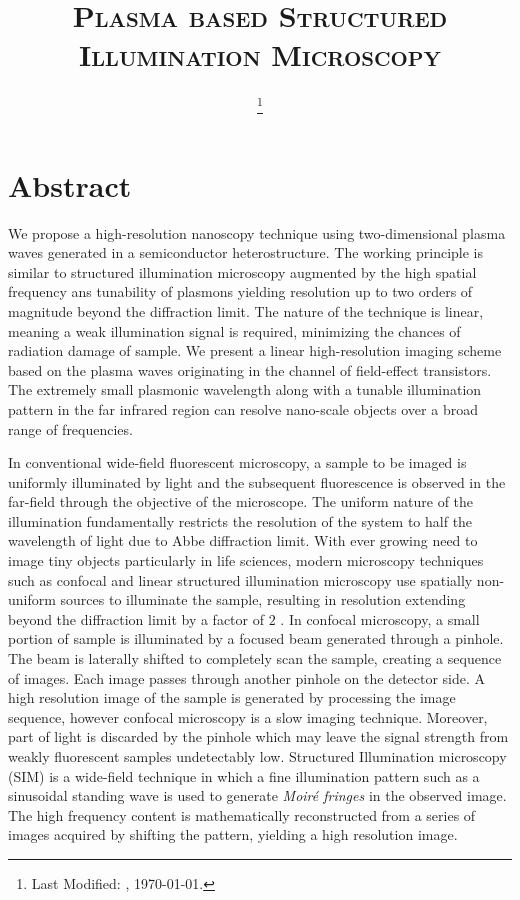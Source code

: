 \documentclass[11pt]{article}
\begin{document}
\title{\textsc{Plasma based Structured Illumination Microscopy}}
\date{\footnote{Last Modified: \currenttime, \today.}}
\maketitle


\section{Abstract}
%
We propose a high-resolution nanoscopy technique using two-dimensional plasma waves generated in a semiconductor heterostructure. The working principle is similar to structured illumination microscopy augmented by the high spatial frequency ans tunability of plasmons yielding resolution up to two orders of magnitude beyond the diffraction limit. The nature of the technique is linear, meaning a weak illumination signal is required, minimizing the chances of radiation damage of sample.
We present a linear high-resolution imaging scheme based on the plasma waves originating in the channel of field-effect transistors. The extremely small plasmonic wavelength along with a tunable illumination pattern in the far infrared region can resolve nano-scale objects over a broad range of frequencies.

In conventional wide-field fluorescent microscopy, a sample to be imaged is uniformly illuminated by light and the subsequent fluorescence is observed in the far-field through the objective of the microscope. The uniform nature of the illumination fundamentally restricts the resolution of the system to half the wavelength of light due to Abbe diffraction limit. With ever growing need to image tiny objects particularly in life sciences, modern microscopy techniques such as confocal and linear structured illumination microscopy use spatially non-uniform sources to illuminate the sample, resulting in resolution extending beyond the diffraction limit by a factor of $2$ \cite{Minsky1988, Gustafsson2005}. In confocal microscopy, a small portion of sample is illuminated by a focused beam generated through a pinhole. The beam is laterally shifted to completely scan the sample, creating a sequence of images. Each image passes through another pinhole on the detector side. A high resolution image of the sample is generated by processing the image sequence, however confocal microscopy is a slow imaging technique. Moreover, part of light is discarded by the pinhole which may leave the signal strength from weakly fluorescent samples undetectably low. Structured Illumination microscopy (SIM) is a wide-field technique in which a fine illumination pattern such as a sinusoidal standing wave is used to generate \emph{Moiré fringes} in the observed image. The high frequency content is mathematically reconstructed from a series of images acquired by shifting the pattern, yielding a high resolution image.
\end{document}
